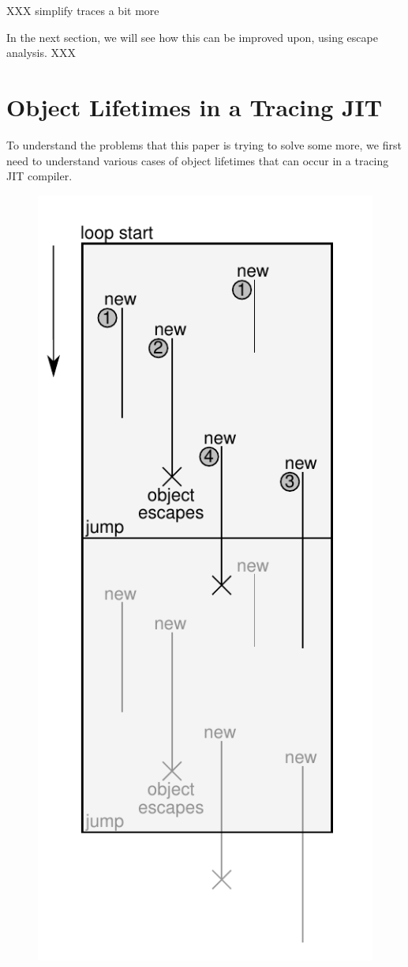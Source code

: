 \documentclass{sigplanconf}
\begin{document}
XXX simplify traces a bit more

In the next section, we will see how this can be improved upon, using escape
analysis. XXX

\section{Object Lifetimes in a Tracing JIT}
\label{sec:lifetimes}


To understand the problems that this paper is trying to solve some more, we
first need to understand various cases of object lifetimes that can occur in a
tracing JIT compiler.

\begin{figure}
\begin{center}
\includegraphics[scale=0.7]{figures/obj-lifetime.pdf}
\end{center}


\end{figure}
\end{document}
